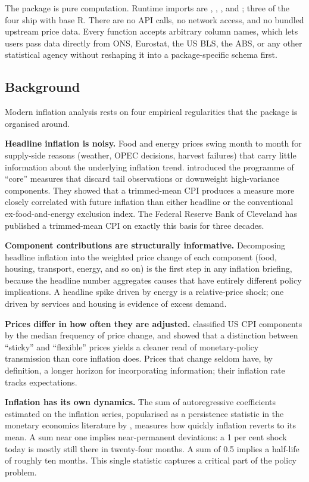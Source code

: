 The package is pure computation. Runtime imports are ,
, , and ; three of the four
ship with base R. There are no API calls, no network access, and no
bundled upstream price data. Every function accepts arbitrary column
names, which lets users pass data directly from ONS, Eurostat, the US
BLS, the ABS, or any other statistical agency without reshaping it into
a package-specific schema first.

\subsection{Background}\label{background}

Modern inflation analysis rests on four empirical regularities that the
package is organised around.

\textbf{Headline inflation is noisy.} Food and energy prices swing month
to month for supply-side reasons (weather, OPEC decisions, harvest
failures) that carry little information about the underlying inflation
trend. \citet{bryan1994measuring} introduced the programme of ``core''
measures that discard tail observations or downweight high-variance
components. They showed that a trimmed-mean CPI produces a measure more
closely correlated with future inflation than either headline or the
conventional ex-food-and-energy exclusion index. The Federal Reserve
Bank of Cleveland has published a trimmed-mean CPI on exactly this basis
for three decades.

\textbf{Component contributions are structurally informative.}
Decomposing headline inflation into the weighted price change of each
component (food, housing, transport, energy, and so on) is the first
step in any inflation briefing, because the headline number aggregates
causes that have entirely different policy implications. A headline
spike driven by energy is a relative-price shock; one driven by services
and housing is evidence of excess demand.

\textbf{Prices differ in how often they are adjusted.}
\citet{bils2004some} classified US CPI components by the median
frequency of price change, and showed that a distinction between
``sticky'' and ``flexible'' prices yields a cleaner read of
monetary-policy transmission than core inflation does. Prices that
change seldom have, by definition, a longer horizon for incorporating
information; their inflation rate tracks expectations.

\textbf{Inflation has its own dynamics.} The sum of autoregressive
coefficients estimated on the inflation series, popularised as a
persistence statistic in the monetary economics literature by
\citet{pivetta2007persistence}, measures how quickly inflation reverts
to its mean. A sum near one implies near-permanent deviations: a 1 per
cent shock today is mostly still there in twenty-four months. A sum of
0.5 implies a half-life of roughly ten months. This single statistic
captures a critical part of the policy problem.

